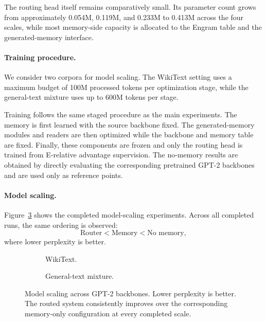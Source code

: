 The routing head itself remains comparatively small. Its parameter count grows
from approximately 0.054M, 0.119M, and 0.233M to 0.413M across the four scales,
while most memory-side capacity is allocated to the Engram table and the
generated-memory interface.

\paragraph{Training procedure.}
We consider two corpora for model scaling. The WikiText setting uses a maximum
budget of 100M processed tokens per optimization stage, while the general-text
mixture uses up to 600M tokens per stage.

Training follows the same staged procedure as the main experiments.
The memory is first learned with the source backbone fixed. The
generated-memory modules and readers are then optimized while the backbone and
memory table are fixed. Finally, these components are frozen and only the
routing head is trained from E-relative advantage supervision.
The no-memory results are obtained by directly evaluating the corresponding
pretrained GPT-2 backbones and are used only as reference points.

\paragraph{Model scaling.}
Figure~\ref{fig:model-scaling} shows the completed model-scaling experiments.
Across all completed runs, the same ordering is observed:
\[
\text{Router} < \text{Memory} < \text{No memory},
\]
where lower perplexity is better.

\begin{figure}[t]
    \centering

    \begin{subfigure}[t]{0.50\linewidth}
        \centering
        \caption{WikiText.}
        \label{fig:scaling-wikitext}
    \end{subfigure}
    \hfill
    \begin{subfigure}[t]{0.46\linewidth}
        \centering
        \caption{General-text mixture.}
        \label{fig:scaling-general}
    \end{subfigure}

    \caption{
    Model scaling across GPT-2 backbones. Lower perplexity is better.
    The routed system consistently improves over the corresponding memory-only
    configuration at every completed scale.
    }
    \label{fig:model-scaling}
\end{figure}


